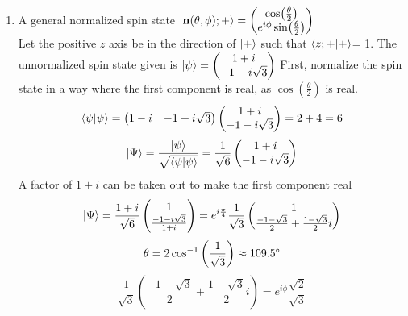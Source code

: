 \begin{sol}
    \begin{enumerate}[label=\textbf{(\alph*)}]
    \item
    A general normalized spin state $\ket{\mathbf{n}(\theta,\phi);+}=\begin{pmatrix}\cos(\frac{\theta}{2})\\e^{i\phi}\sin(\frac{\theta}{2})\end{pmatrix}$\\
    Let the positive $z$ axis be in the direction of $\ket{+}$ such that $\braket{z;+}{+}$= 1. The unnormalized spin state given is $\ket{\psi}=\begin{pmatrix}1+i\\-1-i\sqrt{3}\end{pmatrix}$ 
    First, normalize the spin state in a way where the first component is real, as $\cos(\frac{\theta}{2})$ is real.
    \begin{equation}
	\braket{\psi}{\psi}=\begin{pmatrix}1-i & -1+i\sqrt{3}\end{pmatrix}\begin{pmatrix}1+i\\-1-i\sqrt{3}\end{pmatrix}=2+4=6
\end{equation}
    \begin{equation}
	\ket\Psi=\frac{\ket\psi}{\sqrt{\braket{\psi}{\psi}}}=\frac{1}{\sqrt 6}\begin{pmatrix}1+i\\-1-i\sqrt{3}\end{pmatrix}
\end{equation}
    A factor of $1+i$ can be taken out to make the first component real
    \begin{equation}
	\ket\Psi=\frac{1+i}{\sqrt 6}\begin{pmatrix}1\\\frac{-1-i\sqrt 3}{1+i}\end{pmatrix}=e^{i\frac{\pi}{4}}\frac{1}{\sqrt{3}}\begin{pmatrix}1\\\frac{-1-\sqrt{3}}{2}+\frac{1-\sqrt{3}}{2}i\end{pmatrix}
\end{equation}
    \begin{equation}
	\theta=2\cos^{-1}\left(\frac{1}{\sqrt{3}}\right)\approx 109.5\degree
\end{equation} 
    \begin{equation}
	\frac{1}{\sqrt 3}\left(\frac{-1-\sqrt{3}}{2}+\frac{1-\sqrt{3}}{2}i\right)=e^{i\phi}\frac{\sqrt{2}}{\sqrt{3}}

\end{equation}
\end{enumerate}
\end{sol}
